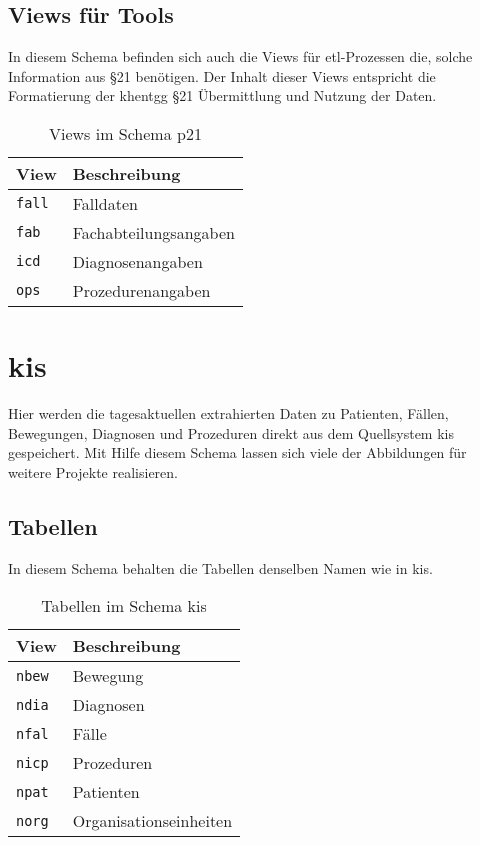 \subsection{Views für Tools}
In diesem Schema befinden sich auch die Views für \ac{etl}-Prozessen die, solche Information aus \S21 benötigen. Der Inhalt dieser Views entspricht die Formatierung der \ac{khentgg} \S 21 Übermittlung und Nutzung der Daten.
     	\begin{table}[ht]
     	\centering   
    	\caption{Views im Schema p21}
     	\begin{tabular}{||l|l||}
     	
     		\hline
     		View & Beschreibung \\ [0.5ex]
     		\hline\hline
     		\texttt{fall} & Falldaten \\
     		\hline
     		\texttt{fab} & Fachabteilungsangaben \\
     		\hline
     		\texttt{icd} & Diagnosenangaben \\
     		\hline
     		\texttt{ops} & Prozedurenangaben \\
     		\hline
     	\end{tabular}
    \end{table}

  \section{kis}
   Hier werden die tagesaktuellen extrahierten Daten zu Patienten, Fällen, Bewegungen, Diagnosen und Prozeduren direkt aus dem Quellsystem \ac{kis} gespeichert. Mit Hilfe diesem Schema lassen sich viele der Abbildungen für weitere Projekte realisieren.
  
   \subsection{Tabellen}
  In diesem Schema behalten die Tabellen denselben Namen wie in \ac{kis}. 
   \begin{table}[ht]
   	\centering   
   	\caption{Tabellen im Schema kis}
   	\begin{tabular}{||l|l||}   		
   		\hline
   		View & Beschreibung \\ [0.5ex]
   		\hline\hline
   		\texttt{nbew} & Bewegung \\
   		\hline
   		\texttt{ndia} & Diagnosen \\
   		\hline
   		\texttt{nfal} & Fälle \\
   		\hline
   		\texttt{nicp} & Prozeduren \\
   		\hline
   		\texttt{npat} & Patienten \\
   		\hline
   		\texttt{norg} & Organisationseinheiten \\
   		\hline
   	\end{tabular}
   \end{table}
  
